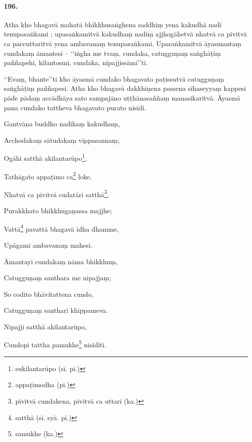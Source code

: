 \paragraph{196.} Atha kho bhagavā mahatā bhikkhusaṅghena saddhiṃ yena kakudhā nadī tenupasaṅkami ; upasaṅkamitvā kakudhaṃ nadiṃ ajjhogāhetvā nhatvā ca pivitvā ca paccuttaritvā yena ambavanaṃ tenupasaṅkami. Upasaṅkamitvā āyasmantaṃ cundakaṃ āmantesi – ‘‘iṅgha me tvaṃ, cundaka, catugguṇaṃ saṅghāṭiṃ paññapehi, kilantosmi, cundaka, nipajjissāmī’’ti.

‘‘Evaṃ, bhante’’ti kho āyasmā cundako bhagavato paṭissutvā catugguṇaṃ saṅghāṭiṃ paññapesi. Atha kho bhagavā dakkhiṇena passena sīhaseyyaṃ kappesi pāde pādaṃ accādhāya sato sampajāno uṭṭhānasaññaṃ manasikaritvā. Āyasmā pana cundako tattheva bhagavato purato nisīdi.

Gantvāna buddho nadikaṃ kakudhaṃ,

Acchodakaṃ sātudakaṃ vippasannaṃ;

Ogāhi satthā akilantarūpo\footnote{sukilantarūpo (sī. pī.)},

Tathāgato appaṭimo ca\footnote{appaṭimodha (pī.)} loke.

Nhatvā ca pivitvā cudatāri satthā\footnote{pivitvā cundakena, pivitvā ca uttari (ka.)},

Purakkhato bhikkhugaṇassa majjhe;

Vattā\footnote{satthā (sī. syā. pī.)} pavattā bhagavā idha dhamme,

Upāgami ambavanaṃ mahesi.

Āmantayi cundakaṃ nāma bhikkhuṃ,

Catugguṇaṃ santhara me nipajjaṃ;

So codito bhāvitattena cundo,

Catugguṇaṃ santhari khippameva.

Nipajji satthā akilantarūpo,

Cundopi tattha pamukhe\footnote{samukhe (ka.)} nisīdīti.

